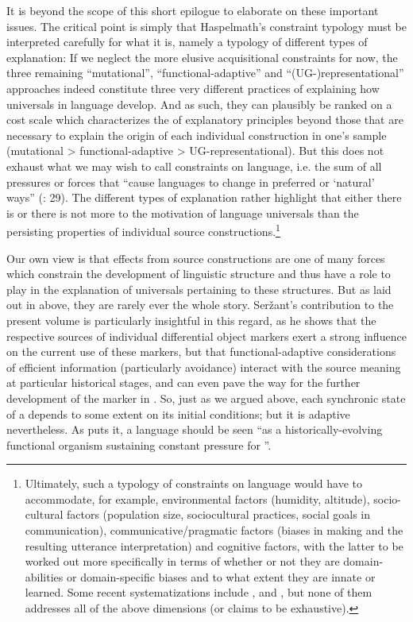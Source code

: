 \documentclass[output=paper]{langsci/langscibook}
\begin{document}
It is beyond the scope of this short epilogue to elaborate on these important issues. The critical point is simply that Haspelmath’s constraint typology must be interpreted carefully for what it is, namely a typology of different types of explanation: If we neglect the more elusive acquisitional constraints for now, the three remaining “mutational”, “functional-adaptive” and “(UG-)representational” approaches indeed constitute three very different practices of explaining how universals in language develop. And as such, they can plausibly be ranked on a cost scale which characterizes the  of explanatory principles beyond those that are necessary to explain the origin of each individual construction in one’s sample (mutational > functional-adaptive > UG-representational). But this does not exhaust what we may wish to call constraints on language, i.e. the sum of all pressures or forces that “cause languages to change in preferred or ‘natural’ ways” (\citealt{BickelEtAl2015}: 29). The different types of explanation rather highlight that either there is or there is not more to the motivation of language universals than the persisting properties of individual source constructions.\footnote{Ultimately, such a typology of constraints on language would have to accommodate, for example, environmental factors (humidity, altitude), socio-cultural factors (population size, sociocultural practices, social goals in communication), communicative/pragmatic factors (biases in  making and the resulting utterance interpretation) and cognitive factors, with the latter to be worked out more specifically in terms of whether or not they are domain- abilities or domain-specific biases and to what extent they are innate or learned. Some recent systematizations include \citet{ChristiansenChater2008}, \citet{EvansLevinson2009} and \citet{Bybee2010}, but none of them addresses all of the above dimensions (or claims to be exhaustive).} 

Our own view is that  effects from source constructions are one of many forces which constrain the development of linguistic structure and thus have a role to play in the explanation of universals pertaining to these structures. But as laid out in  above, they are rarely ever the whole story. Seržant’s contribution to the present volume is particularly insightful in this regard, as he shows that the respective sources of individual differential object markers exert a strong influence on the current use of these markers, but that functional-adaptive considerations of efficient information  (particularly  avoidance) interact with the source meaning at particular historical stages, and can even pave the way for the further development of the marker in . So, just as we argued above, each synchronic state of a  depends to some extent on its initial conditions; but it is adaptive nevertheless. As \citet[263]{Shibatani2006} puts it, a language should be seen “as a historically-evolving functional organism sustaining constant pressure for ”. 
\end{document}
